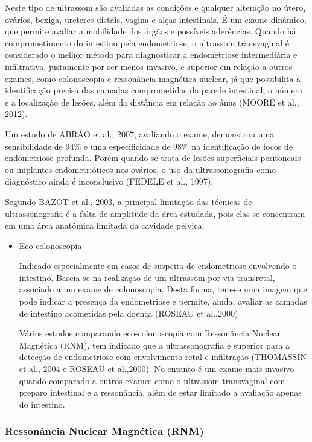 \documentclass[12pt]{article} %
\begin{document}
Neste tipo de ultrassom são avaliadas as condições e qualquer
alteração no útero, ovários, bexiga, ureteres distais, vagina e alças
intestinais. É um exame dinâmico, que permite avaliar a mobilidade dos
órgãos e possíveis aderências. Quando há comprometimento do intestino
pela endometriose, o ultrassom transvaginal é considerado o melhor
método para diagnosticar a endometriose intermediária e infiltrativa,
justamente por ser menos invasivo, e superior em relação a outros
exames, como colonoscopia e ressonância magnética nuclear, já que
possibilita a identificação precisa das camadas comprometidas da
parede intestinal, o número e a localização de lesões, além da
distância em relação ao ânus (MOORE et al., 2012).

Um estudo de ABRÃO et al., 2007, avaliando o exame, demonstrou uma sensibilidade de 94\% e uma especificidade de 98\% na identificação de focos de endometriose profunda. Porém quando se trata de lesões superficiais peritoneais ou implantes endometrióticos nos ovários, o uso da ultrassonografia como diagnóstico ainda é inconclusivo (FEDELE et al., 1997).
\newpage

Segundo BAZOT et al., 2003, a principal limitação das técnicas de ultrassonografia é a falta de amplitude da área estudada, pois elas se concentram em uma área anatômica limitada da cavidade pélvica.




\begin{itemize}
\item Eco-colonoscopia

Indicado especialmente em casos de suspeita de endometriose envolvendo o intestino. Baseia-se na realização de um ultrassom por via transretal, associado a um exame de colonoscopia. Desta forma, tem-se uma imagem que pode indicar a presença da endometriose e permite, ainda, avaliar as camadas de intestino acometidas pela doença (ROSEAU et al.,2000)

Vários estudos comparando eco-colonoscopia com Ressonância Nuclear Magnética (RNM), tem
indicado que a ultrassonografia é superior para a detecção de endometriose com envolvimento retal e
infiltração (THOMASSIN et al., 2004 e ROSEAU et al.,2000). No entanto é um exame mais invasivo quando comparado a outros exames como o ultrassom transvaginal com preparo intestinal e a ressonância, além de estar limitado à avaliação apenas do intestino.
\end{itemize}

\subsubsection{Ressonância Nuclear Magnética (RNM)}
\end{document}
